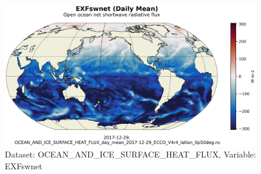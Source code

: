 \begin{figure}[H]
\centering
\includegraphics[scale=0.55]{../images/plots/latlon_plots/Ocean_and_Sea-Ice_Surface_Heat_Fluxes/EXFswnet.png}
\caption{Dataset: OCEAN\_AND\_ICE\_SURFACE\_HEAT\_FLUX, Variable: EXFswnet}
\label{tab:table-OCEAN_AND_ICE_SURFACE_HEAT_FLUX_EXFswnet-Plot}
\end{figure}
\pagebreak
